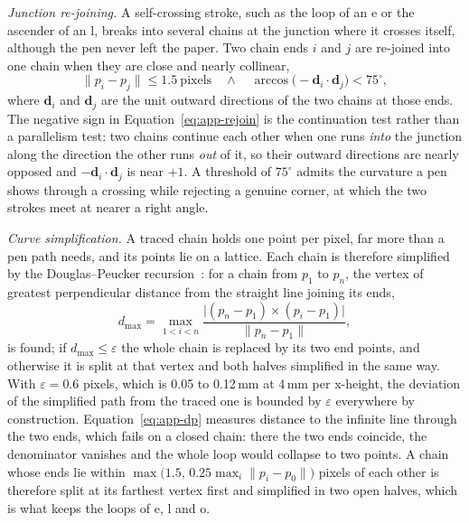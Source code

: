 \emph{Junction re-joining.}
A self-crossing stroke, such as the loop of an e or the ascender of an l, breaks into several chains at the junction where it crosses itself, although the pen never left the paper.
Two chain ends $i$ and $j$ are re-joined into one chain when they are close and nearly collinear,
\begin{equation}
\lVert p_i-p_j\rVert\le1.5\ \text{pixels}\quad\wedge\quad \arccos\bigl(-\mathbf d_i\cdot\mathbf d_j\bigr)<75^\circ,
\label{eq:app-rejoin}
\end{equation}
where $\mathbf d_i$ and $\mathbf d_j$ are the unit outward directions of the two chains at those ends.
The negative sign in Equation~\ref{eq:app-rejoin} is the continuation test rather than a parallelism test: two chains continue each other when one runs \emph{into} the junction along the direction the other runs \emph{out} of it, so their outward directions are nearly opposed and $-\mathbf d_i\cdot\mathbf d_j$ is near $+1$.
A threshold of $75^\circ$ admits the curvature a pen shows through a crossing while rejecting a genuine corner, at which the two strokes meet at nearer a right angle.

\emph{Curve simplification.}
A traced chain holds one point per pixel, far more than a pen path needs, and its points lie on a lattice.
Each chain is therefore simplified by the Douglas--Peucker recursion~\cite{teikari2016}: for a chain from $p_1$ to $p_n$, the vertex of greatest perpendicular distance from the straight line joining its ends,
\begin{equation}
d_{\max}=\max_{1<i<n}\frac{\bigl\lvert(p_n-p_1)\times(p_i-p_1)\bigr\rvert}{\lVert p_n-p_1\rVert},
\label{eq:app-dp}
\end{equation}
is found; if $d_{\max}\le\varepsilon$ the whole chain is replaced by its two end points, and otherwise it is split at that vertex and both halves simplified in the same way.
With $\varepsilon=0.6$ pixels, which is 0.05 to 0.12\,mm at 4\,mm per x-height, the deviation of the simplified path from the traced one is bounded by $\varepsilon$ everywhere by construction.
Equation~\ref{eq:app-dp} measures distance to the infinite line through the two ends, which fails on a closed chain: there the two ends coincide, the denominator vanishes and the whole loop would collapse to two points.
A chain whose ends lie within $\max\bigl(1.5,\,0.25\max_i\lVert p_i-p_0\rVert\bigr)$ pixels of each other is therefore split at its farthest vertex first and simplified in two open halves, which is what keeps the loops of e, l and o.

